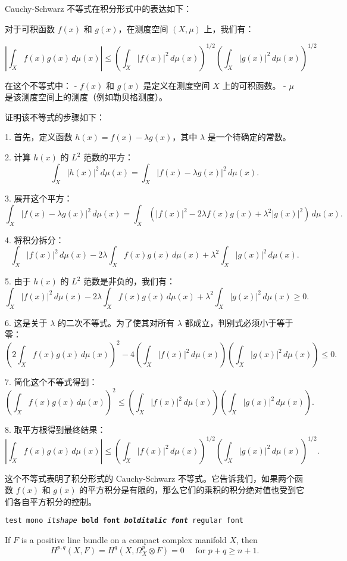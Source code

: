 \documentclass[lang=cn,zihao=-4,a4paper,fontset=none]{beautybook}
\begin{document}
Cauchy-Schwarz 不等式在积分形式中的表达如下：

对于可积函数 $f(x)$ 和 $g(x)$，在测度空间 $(X, \mu)$ 上，我们有：

$$
\left| \int_X f(x) g(x) \, d\mu(x) \right| \leq \left( \int_X |f(x)|^2 \, d\mu(x) \right)^{1/2} \left( \int_X |g(x)|^2 \, d\mu(x) \right)^{1/2}
$$

在这个不等式中：
- $f(x)$ 和 $g(x)$ 是定义在测度空间 $X$ 上的可积函数。
- $\mu$ 是该测度空间上的测度（例如勒贝格测度）。

证明该不等式的步骤如下：

1. 首先，定义函数 $h(x) = f(x) - \lambda g(x)$，其中 $\lambda$ 是一个待确定的常数。

2. 计算 $h(x)$ 的 $L^2$ 范数的平方：
   $$
   \int_X |h(x)|^2 \, d\mu(x) = \int_X |f(x) - \lambda g(x)|^2 \, d\mu(x).
   $$

3. 展开这个平方：
   $$
   \int_X |f(x) - \lambda g(x)|^2 \, d\mu(x) = \int_X \left( |f(x)|^2 - 2 \lambda f(x) g(x) + \lambda^2 |g(x)|^2 \right) \, d\mu(x).
   $$

4. 将积分拆分：
   $$
   \int_X |f(x)|^2 \, d\mu(x) - 2 \lambda \int_X f(x) g(x) \, d\mu(x) + \lambda^2 \int_X |g(x)|^2 \, d\mu(x).
   $$

5. 由于 $h(x)$ 的 $L^2$ 范数是非负的，我们有：
   $$
   \int_X |f(x)|^2 \, d\mu(x) - 2 \lambda \int_X f(x) g(x) \, d\mu(x) + \lambda^2 \int_X |g(x)|^2 \, d\mu(x) \geq 0.
   $$

6. 这是关于 $\lambda$ 的二次不等式。为了使其对所有 $\lambda$ 都成立，判别式必须小于等于零：
   $$
   (2 \int_X f(x) g(x) \, d\mu(x))^2 - 4 \left( \int_X |f(x)|^2 \, d\mu(x) \right) \left( \int_X |g(x)|^2 \, d\mu(x) \right) \leq 0.
   $$

7. 简化这个不等式得到：
   $$
   \left( \int_X f(x) g(x) \, d\mu(x) \right)^2 \leq \left( \int_X |f(x)|^2 \, d\mu(x) \right) \left( \int_X |g(x)|^2 \, d\mu(x) \right).
   $$

8. 取平方根得到最终结果：
   $$
   \left| \int_X f(x) g(x) \, d\mu(x) \right| \leq \left( \int_X |f(x)|^2 \, d\mu(x) \right)^{1/2} \left( \int_X |g(x)|^2 \, d\mu(x) \right)^{1/2}.
   $$

这个不等式表明了积分形式的 Cauchy-Schwarz 不等式。它告诉我们，如果两个函数 $f(x)$ 和 $g(x)$ 的平方积分是有限的，那么它们的乘积的积分绝对值也受到它们各自平方积分的控制。


\texttt{test mono \textit{itshape} \textbf{bold font} \textbf{\textit{bolditalic font}} regular font}


\begin{theorem}
    If $F$ is a positive line bundle on a compact complex manifold $X$, then
    $$
    H^{p, q}(X, F)=H^q\left(X, \Omega_X^p \otimes F\right)=0 \quad \text { for } p+q \geqslant n+1 .
    $$
\end{theorem}
    
\end{document}
